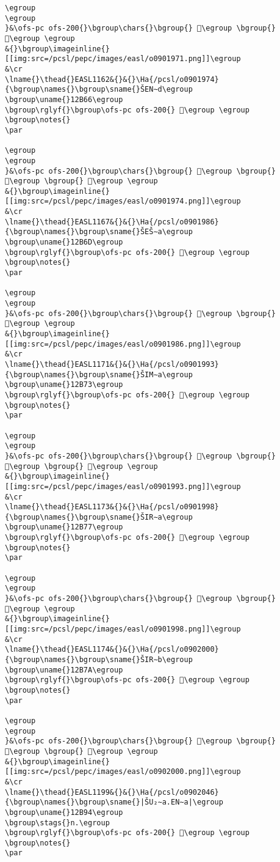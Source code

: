 \begin{verbatim}
\egroup
\egroup
}&\ofs-pc ofs-200{}\bgroup\chars{}\bgroup{} 𒭢\egroup \bgroup{} 𒭣\egroup \egroup
&{}\bgroup\imageinline{}[[img:src=/pcsl/pepc/images/easl/o0901971.png]]\egroup
&\cr
\lname{}\thead{}EASL1162&{}&{}\Ha{/pcsl/o0901974}{\bgroup\names{}\bgroup\sname{}ŠEN∼d\egroup
\bgroup\uname{}12B66\egroup
\bgroup\rglyf{}\bgroup\ofs-pc ofs-200{} 𒭦\egroup \egroup
\bgroup\notes{}
\par 

\egroup
\egroup
}&\ofs-pc ofs-200{}\bgroup\chars{}\bgroup{} 𒭦\egroup \bgroup{} 𒭨\egroup \bgroup{} 𒭩\egroup \egroup
&{}\bgroup\imageinline{}[[img:src=/pcsl/pepc/images/easl/o0901974.png]]\egroup
&\cr
\lname{}\thead{}EASL1167&{}&{}\Ha{/pcsl/o0901986}{\bgroup\names{}\bgroup\sname{}ŠEŠ∼a\egroup
\bgroup\uname{}12B6D\egroup
\bgroup\rglyf{}\bgroup\ofs-pc ofs-200{} 𒭭\egroup \egroup
\bgroup\notes{}
\par 

\egroup
\egroup
}&\ofs-pc ofs-200{}\bgroup\chars{}\bgroup{} 𒭭\egroup \bgroup{} 𒭮\egroup \egroup
&{}\bgroup\imageinline{}[[img:src=/pcsl/pepc/images/easl/o0901986.png]]\egroup
&\cr
\lname{}\thead{}EASL1171&{}&{}\Ha{/pcsl/o0901993}{\bgroup\names{}\bgroup\sname{}ŠIM∼a\egroup
\bgroup\uname{}12B73\egroup
\bgroup\rglyf{}\bgroup\ofs-pc ofs-200{} 𒭳\egroup \egroup
\bgroup\notes{}
\par 

\egroup
\egroup
}&\ofs-pc ofs-200{}\bgroup\chars{}\bgroup{} 𒭲\egroup \bgroup{} 𒭳\egroup \bgroup{} 𒭴\egroup \egroup
&{}\bgroup\imageinline{}[[img:src=/pcsl/pepc/images/easl/o0901993.png]]\egroup
&\cr
\lname{}\thead{}EASL1173&{}&{}\Ha{/pcsl/o0901998}{\bgroup\names{}\bgroup\sname{}ŠIR∼a\egroup
\bgroup\uname{}12B77\egroup
\bgroup\rglyf{}\bgroup\ofs-pc ofs-200{} 𒭷\egroup \egroup
\bgroup\notes{}
\par 

\egroup
\egroup
}&\ofs-pc ofs-200{}\bgroup\chars{}\bgroup{} 𒭶\egroup \bgroup{} 𒭷\egroup \egroup
&{}\bgroup\imageinline{}[[img:src=/pcsl/pepc/images/easl/o0901998.png]]\egroup
&\cr
\lname{}\thead{}EASL1174&{}&{}\Ha{/pcsl/o0902000}{\bgroup\names{}\bgroup\sname{}ŠIR∼b\egroup
\bgroup\uname{}12B7A\egroup
\bgroup\rglyf{}\bgroup\ofs-pc ofs-200{} 𒭺\egroup \egroup
\bgroup\notes{}
\par 

\egroup
\egroup
}&\ofs-pc ofs-200{}\bgroup\chars{}\bgroup{} 𒭸\egroup \bgroup{} 𒭹\egroup \bgroup{} 𒭺\egroup \egroup
&{}\bgroup\imageinline{}[[img:src=/pcsl/pepc/images/easl/o0902000.png]]\egroup
&\cr
\lname{}\thead{}EASL1199&{}&{}\Ha{/pcsl/o0902046}{\bgroup\names{}\bgroup\sname{}|ŠU₂∼a.EN∼a|\egroup
\bgroup\uname{}12B94\egroup
\bgroup\stags{}n.\egroup
\bgroup\rglyf{}\bgroup\ofs-pc ofs-200{} 𒮔\egroup \egroup
\bgroup\notes{}
\par 


\end{verbatim}
